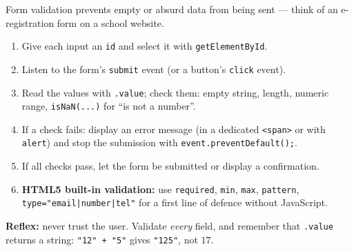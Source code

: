\documentclass[11pt]{article}
\begin{document}
\begin{methode}
Form validation prevents empty or absurd data from being sent — think of an e-registration form on a school website.
\begin{enumerate}
\item Give each input an \texttt{id} and select it with \texttt{getElementById}.
\item Listen to the form's \texttt{submit} event (or a button's \texttt{click} event).
\item Read the values with \texttt{.value}; check them: empty string, length, numeric range, \texttt{isNaN(...)} for ``is not a number''.
\item If a check fails: display an error message (in a dedicated \texttt{<span>} or with \texttt{alert}) and stop the submission with \texttt{event.preventDefault();}.
\item If all checks pass, let the form be submitted or display a confirmation.
\item \textbf{HTML5 built-in validation:} use \texttt{required}, \texttt{min}, \texttt{max}, \texttt{pattern}, \texttt{type="email|number|tel"} for a first line of defence without JavaScript.
\end{enumerate}
\textbf{Reflex:} never trust the user. Validate \emph{every} field, and remember that \texttt{.value} returns a string: \texttt{"12" + "5"} gives \texttt{"125"}, not $17$.
\end{methode}
\end{document}
